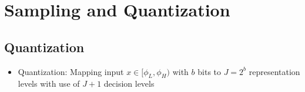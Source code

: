 
\section{Sampling and Quantization}
\subsection{Quantization}

\begin{itemize}
	\item
		Quantization: Mapping input $x \in [\phi_L, \phi_H)$ with $b$ bits to $J = 2^b$ representation levels with use of $J+1$ decision levels
\end{itemize}

